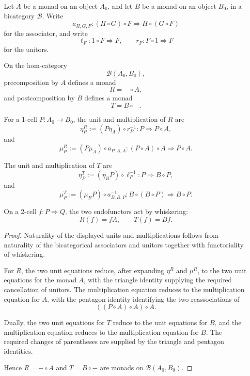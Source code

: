 \begin{lemma}
\label{lem:local-monads-induced-by-endpoint-monads}
    Let \(A\) be a monad on an object \(A_0\), and let \(B\) be a monad on an
    object \(B_0\), in a bicategory \(\mathcal B\). Write
    \[
        a_{H,G,F}:(H\circ G)\circ F
        \Longrightarrow
        H\circ(G\circ F)
    \]
    for the associator, and write
    \[
        \ell_F:1\circ F\Longrightarrow F,
        \qquad
        r_F:F\circ1\Longrightarrow F
    \]
    for the unitors.

    On the hom-category
    \[
        \mathcal B(A_0,B_0),
    \]
    precomposition by \(A\) defines a monad
    \[
        R=-\circ A,
    \]
    and postcomposition by \(B\) defines a monad
    \[
        T=B\circ-.
    \]

    For a 1-cell \(P:A_0\to B_0\), the unit and multiplication of \(R\) are
    \[
        \eta^R_P
        :=
        (P\eta_A)\circ r_P^{-1}
        :
        P
        \Longrightarrow
        P\circ A,
    \]
    and
    \[
        \mu^R_P
        :=
        (P\mu_A)\circ a_{P,A,A}
        :
        (P\circ A)\circ A
        \Longrightarrow
        P\circ A.
    \]

    The unit and multiplication of \(T\) are
    \[
        \eta^T_P
        :=
        (\eta_B P)\circ\ell_P^{-1}
        :
        P
        \Longrightarrow
        B\circ P,
    \]
    and
    \[
        \mu^T_P
        :=
        (\mu_B P)\circ a_{B,B,P}^{-1}
        :
        B\circ(B\circ P)
        \Longrightarrow
        B\circ P.
    \]

    On a 2-cell \(f:P\Rightarrow Q\), the two endofunctors act by whiskering:
    \[
        R(f)=fA,
        \qquad
        T(f)=Bf.
    \]
\end{lemma}
\begin{proof}
    Naturality of the displayed units and multiplications follows from
    naturality of the bicategorical associators and unitors together with
    functoriality of whiskering.

    For \(R\), the two unit equations reduce, after expanding
    \(\eta^R\) and \(\mu^R\), to the two unit equations for the monad \(A\),
    with the triangle identity supplying the required cancellation of
    unitors. The multiplication equation reduces to the multiplication
    equation for \(A\), with the pentagon identity identifying the two
    reassociations of
    \[
        ((P\circ A)\circ A)\circ A.
    \]

    Dually, the two unit equations for \(T\) reduce to the unit equations for
    \(B\), and the multiplication equation reduces to the multiplication
    equation for \(B\). The required changes of parentheses are supplied by
    the triangle and pentagon identities.

    Hence \(R=-\circ A\) and \(T=B\circ-\) are monads on
    \(\mathcal B(A_0,B_0)\).
\end{proof}

